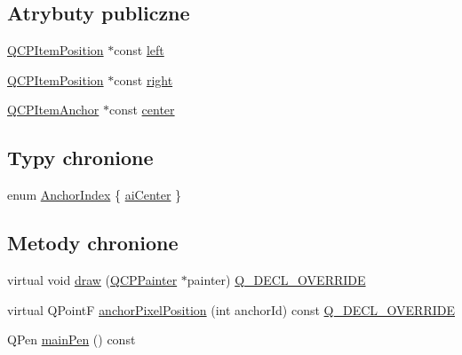 \subsection*{Atrybuty publiczne}
\begin{DoxyCompactItemize}
\item 
\hyperlink{class_q_c_p_item_position}{Q\+C\+P\+Item\+Position} $\ast$const \hyperlink{class_q_c_p_item_bracket_af6cc6d27d96171778c6927d6edce48b0}{left}
\item 
\hyperlink{class_q_c_p_item_position}{Q\+C\+P\+Item\+Position} $\ast$const \hyperlink{class_q_c_p_item_bracket_afa6c1360b05a50c4e0df37b3cebab6be}{right}
\item 
\hyperlink{class_q_c_p_item_anchor}{Q\+C\+P\+Item\+Anchor} $\ast$const \hyperlink{class_q_c_p_item_bracket_a2dbcabdf5f467f28be12a7b25962ffca}{center}
\end{DoxyCompactItemize}
\subsection*{Typy chronione}
\begin{DoxyCompactItemize}
\item 
enum \hyperlink{class_q_c_p_item_bracket_a7f3a6a56d67f71219ed220553f3dd861}{Anchor\+Index} \{ \hyperlink{class_q_c_p_item_bracket_a7f3a6a56d67f71219ed220553f3dd861a17b57ef34cc05eadfe9becd1ad5b5242}{ai\+Center}
 \}
\end{DoxyCompactItemize}
\subsection*{Metody chronione}
\begin{DoxyCompactItemize}
\item 
virtual void \hyperlink{class_q_c_p_item_bracket_a942a3978aea44a2fc7b4383f2bf6d417}{draw} (\hyperlink{class_q_c_p_painter}{Q\+C\+P\+Painter} $\ast$painter) \hyperlink{qcustomplot_8hh_a42cc5eaeb25b85f8b52d2a4b94c56f55}{Q\+\_\+\+D\+E\+C\+L\+\_\+\+O\+V\+E\+R\+R\+I\+DE}
\item 
virtual Q\+PointF \hyperlink{class_q_c_p_item_bracket_a008d87325d26b6616d368cec06027cce}{anchor\+Pixel\+Position} (int anchor\+Id) const \hyperlink{qcustomplot_8hh_a42cc5eaeb25b85f8b52d2a4b94c56f55}{Q\+\_\+\+D\+E\+C\+L\+\_\+\+O\+V\+E\+R\+R\+I\+DE}
\item 
Q\+Pen \hyperlink{class_q_c_p_item_bracket_a8df4ad873bf88a4a7bfb9bbbd490e495}{main\+Pen} () const 
\end{DoxyCompactItemize}

